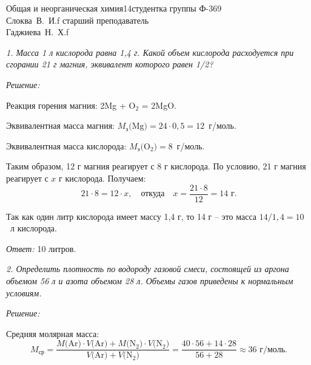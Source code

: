 




\newcommand{\bi}[1]{\( _{#1} \)}
\newcommand{\ui}[1]{\( ^{#1} \)}
\renewcommand{\.}{\;\!}
\newcommand{\Ch}[1]{\mathrm{#1}}
\renewcommand{\L}{\bigl}
\newcommand{\R}{\bigr}



{Общая и неорганическая химия}{}{14}{студентка группы Ф-369\\Слоква~В.~И.}{f}
{старший преподаватель\\Гаджиева~Н.~Х.}{f}


\emph{1. Масса 1 л кислорода равна 1,4 г. Какой объем кислорода расходуется при
сгорании 21 г магния, эквивалент которого равен 1\!/2?}

\vspace*{2em}
\emph{Решение:}

Реакция горения магния: 2Mg + O\bi{2} = 2Mg\.O.

Эквивалентная масса магния:
\( M_\text{э} \R(\Ch{Mg}\L) = 24\cdot0,\!5 = 12 \)~г/моль.

Эквивалентная масса кислорода:
\( M_\text{э} \R(\Ch{O}_2\L) = 8 \)~г/моль.

Таким образом, 12 г магния реагирует с 8 г кислорода. По условию, 21 г магния
реагирует с \( x \) г кислорода. Получаем:
\[
    21\cdot 8 = 12\cdot x, \quad \text{откуда} \quad x = \frac{21\cdot8}{12} =
    14 \text{ г}.
\]

Так как один литр кислорода имеет массу 1,4 г, то 14 г -- это масса
\( 14/1,\!4 = 10 \)~л кислорода.

\vspace*{2em}
\emph{Ответ:} 10 литров.

\newpage %

\emph{2. Определить плотность по водороду газовой смеси, состоящей из аргона
объемом 56 л и азота объемом 28 л. Объемы газов приведены к нормальным
условиям.}

\vspace*{2em}
\emph{Решение:}

Средняя молярная масса:
\[
    M_\text{ср} = \frac{M\R(\Ch{Ar}\L) \cdot V\R(\Ch{Ar}\L) + M\R(\Ch{N}_2\L)
    \cdot V\R(\Ch{N}_2\L)}{V\R(\Ch{Ar}\L) + V\R(\Ch{N}_2\L)} = \frac{40\cdot 56
    + 14\cdot 28}{56 + 28} \approx 36 \text{ г/моль}.
\]

